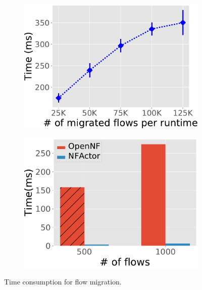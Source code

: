  \begin{figure}[!t]
	\begin{subfigure}[t]{0.49\linewidth}
		\centering
		\includegraphics[width=\columnwidth]{figure/Migration.pdf}
		\caption{}\label{fig:tot-mig} \end{subfigure}\hfill
	 \begin{subfigure}[t]{0.49\linewidth}
		\centering
		\includegraphics[width=\columnwidth]{figure/Compare.pdf}
		\caption{}\label{fig:compare-opennf}
	 \end{subfigure}
\caption{ Time consumption for flow migration.} %
\label{fig:mig-perf}
\end{figure}


